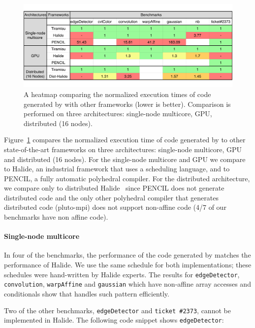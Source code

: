 \begin{figure}[t]
\centering
\includegraphics[width=1.05\columnwidth,trim=50 10 10 10]{./figures/tiramisu_heatmap.pdf}
\vspace{-0.5cm}
\caption{A heatmap comparing the normalized execution times of code generated by \framework{} with other frameworks (lower is better).  Comparison is performed on three architectures: single-node multicore, GPU, distributed (16 nodes).}
\label{fig:speedup}

\end{figure}

Figure~\ref{fig:speedup} compares the normalized execution time of code generated by \framework{} to other state-of-the-art frameworks on three architectures: single-node multicore, GPU and distributed (16 nodes).  For the single-node multicore and GPU we compare \framework{} to Halide, an industrial framework that uses a scheduling language, and to PENCIL, a fully automatic polyhedral compiler.  For the distributed architecture, we compare only to distributed Halide~\cite{denniston2016distributed} since PENCIL does not generate distributed code and the only other polyhedral compiler that generates distributed code (pluto-mpi) does not support non-affine code (4/7 of our benchmarks have non affine code).

\paragraph{Single-node multicore}
In four of the benchmarks, the performance of the code generated by \framework{} matches the performance of Halide.  We use the same schedule for both implementations; these schedules were hand-written by Halide experts.  The results for \texttt{edgeDetector}, \texttt{convolution}, \texttt{warpAffine} and \texttt{gaussian} which have non-affine array accesses and conditionals show that \framework{} handles such pattern efficiently.

Two of the other benchmarks, \texttt{edgeDetector} and \texttt{ticket \#2373}, cannot be implemented in Halide.  The following code snippet shows \texttt{edgeDetector}:

